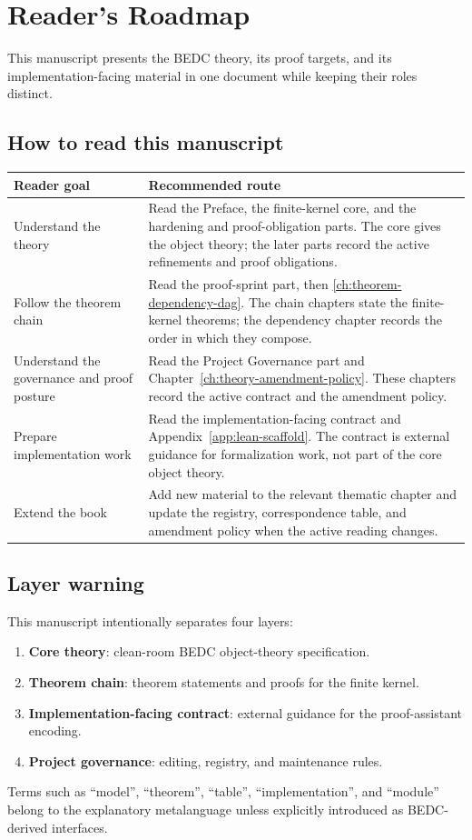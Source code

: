 \chapter*{Reader's Roadmap}

This manuscript presents the BEDC theory, its proof targets, and its implementation-facing material in one document while keeping their roles distinct.

\section*{How to read this manuscript}

\begin{longtable}{p{}p{}}
\toprule
\textbf{Reader goal} & \textbf{Recommended route}\\
\midrule
Understand the theory & Read the Preface, the finite-kernel core, and the hardening and proof-obligation parts. The core gives the object theory; the later parts record the active refinements and proof obligations.\\
Follow the theorem chain & Read the proof-sprint part, then \autoref{ch:theorem-dependency-dag}. The chain chapters state the finite-kernel theorems; the dependency chapter records the order in which they compose.\\
Understand the governance and proof posture & Read the Project Governance part and Chapter~\ref{ch:theory-amendment-policy}. These chapters record the active contract and the amendment policy.\\
Prepare implementation work & Read the implementation-facing contract and Appendix~\ref{app:lean-scaffold}. The contract is external guidance for formalization work, not part of the core object theory.\\
Extend the book & Add new material to the relevant thematic chapter and update the registry, correspondence table, and amendment policy when the active reading changes.\\
\bottomrule
\end{longtable}

\section*{Layer warning}

This manuscript intentionally separates four layers:
\begin{enumerate}
  \item \textbf{Core theory}: clean-room BEDC object-theory specification.
  \item \textbf{Theorem chain}: theorem statements and proofs for the finite kernel.
  \item \textbf{Implementation-facing contract}: external guidance for the proof-assistant encoding.
  \item \textbf{Project governance}: editing, registry, and maintenance rules.
\end{enumerate}
Terms such as ``model'', ``theorem'', ``table'', ``implementation'', and ``module'' belong to the explanatory metalanguage unless explicitly introduced as BEDC-derived interfaces.

